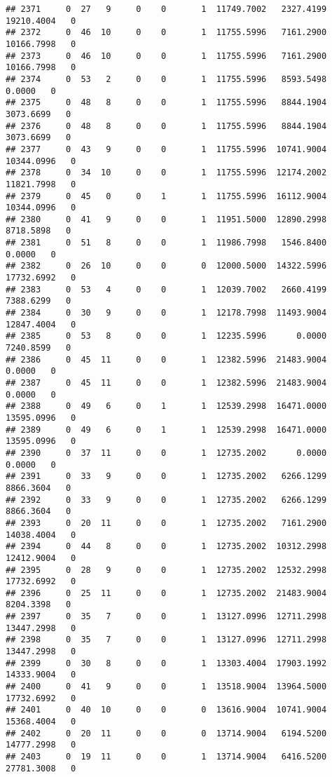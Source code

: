\documentclass[
]{article}
\begin{document}
\begin{enumerate}
\begin{verbatim}
## 2371     0  27   9     0    0       1  11749.7002   2327.4199  19210.4004   0
## 2372     0  46  10     0    0       1  11755.5996   7161.2900  10166.7998   0
## 2373     0  46  10     0    0       1  11755.5996   7161.2900  10166.7998   0
## 2374     0  53   2     0    0       1  11755.5996   8593.5498      0.0000   0
## 2375     0  48   8     0    0       1  11755.5996   8844.1904   3073.6699   0
## 2376     0  48   8     0    0       1  11755.5996   8844.1904   3073.6699   0
## 2377     0  43   9     0    0       1  11755.5996  10741.9004  10344.0996   0
## 2378     0  34  10     0    0       1  11755.5996  12174.2002  11821.7998   0
## 2379     0  45   0     0    1       1  11755.5996  16112.9004  10344.0996   0
## 2380     0  41   9     0    0       1  11951.5000  12890.2998   8718.5898   0
## 2381     0  51   8     0    0       1  11986.7998   1546.8400      0.0000   0
## 2382     0  26  10     0    0       0  12000.5000  14322.5996  17732.6992   0
## 2383     0  53   4     0    0       1  12039.7002   2660.4199   7388.6299   0
## 2384     0  30   9     0    0       1  12178.7998  11493.9004  12847.4004   0
## 2385     0  53   8     0    0       1  12235.5996      0.0000   7240.8599   0
## 2386     0  45  11     0    0       1  12382.5996  21483.9004      0.0000   0
## 2387     0  45  11     0    0       1  12382.5996  21483.9004      0.0000   0
## 2388     0  49   6     0    1       1  12539.2998  16471.0000  13595.0996   0
## 2389     0  49   6     0    1       1  12539.2998  16471.0000  13595.0996   0
## 2390     0  37  11     0    0       1  12735.2002      0.0000      0.0000   0
## 2391     0  33   9     0    0       1  12735.2002   6266.1299   8866.3604   0
## 2392     0  33   9     0    0       1  12735.2002   6266.1299   8866.3604   0
## 2393     0  20  11     0    0       1  12735.2002   7161.2900  14038.4004   0
## 2394     0  44   8     0    0       1  12735.2002  10312.2998  12412.9004   0
## 2395     0  28   9     0    0       1  12735.2002  12532.2998  17732.6992   0
## 2396     0  25  11     0    0       1  12735.2002  21483.9004   8204.3398   0
## 2397     0  35   7     0    0       1  13127.0996  12711.2998  13447.2998   0
## 2398     0  35   7     0    0       1  13127.0996  12711.2998  13447.2998   0
## 2399     0  30   8     0    0       1  13303.4004  17903.1992  14333.9004   0
## 2400     0  41   9     0    0       1  13518.9004  13964.5000  17732.6992   0
## 2401     0  40  10     0    0       0  13616.9004  10741.9004  15368.4004   0
## 2402     0  20  11     0    0       0  13714.9004   6194.5200  14777.2998   0
## 2403     0  19  11     0    0       1  13714.9004   6416.5200  27781.3008   0

\end{verbatim}
\end{enumerate}
\end{document}
